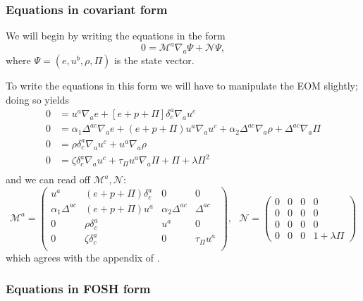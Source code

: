 \documentclass[12pt]{article}
\numberwithin{equation}{section}
\begin{document}
\subsubsection{Equations in covariant form}

We will begin by writing the equations in the form
\begin{equation}
0 = \mathcal{M}^a \nabla_a \Psi + \mathcal{N} \Psi,
\end{equation}
where $\Psi = (e, u^b, \rho, \Pi)$ is the state vector.

To write the equations in this form we will have to manipulate the EOM slightly; doing so yields
\begin{equation}
\begin{aligned}
0 &= u^a \nabla_{a} e + [e + p + \Pi] \delta^{a}_{c} \nabla_{a} u^c \\
0 &= \alpha_1 \Delta^{ac} \nabla_a e + (e + p + \Pi) u^a \nabla_{a} u^c + \alpha_2 \Delta^{ac} \nabla_a \rho + \Delta^{ac} \nabla_{a} \Pi \\
0 &= \rho \delta^{a}_{c} \nabla_{a} u^c + u^a \nabla_{a} \rho \\
0 &= \zeta \delta^{a}_{c} \nabla_a u^c + \tau_{\Pi} u^a \nabla_a \Pi + \Pi + \lambda \Pi^2 \\
\end{aligned}
\end{equation}
and we can read off $\mathcal{M}^{a}, \mathcal{N}$:
\begin{equation}
\mathcal{M}^{a} =
\begin{pmatrix}
u^a & (e+p+\Pi) \delta^{a}_{c} & 0 & 0 \\
\alpha_1 \Delta^{ac} & (e+p+\Pi) u^a & \alpha_2 \Delta^{ac} & \Delta^{ac} \\
0 & \rho \delta^{a}_{c} & u^a & 0 \\
0 & \zeta \delta^{a}_{c} & 0 & \tau_{\Pi} u^a \\
\end{pmatrix},~~~
\mathcal{N} =
\begin{pmatrix}
0 & 0 & 0 & 0 \\
0 & 0 & 0 & 0 \\
0 & 0 & 0 & 0 \\
0 & 0 & 0 & 1 + \lambda \Pi
\end{pmatrix}
\end{equation}
which agrees with the appendix of \cite{Bemfica19}.


\subsubsection{Equations in FOSH form}
\end{document}
